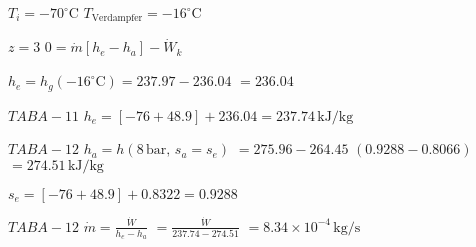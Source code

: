 \( T_i = -70^\circ \text{C} \)  
\( T_{\text{Verdampfer}} = -16^\circ \text{C} \)  

\( z = 3 \)  
\( 0 = \dot{m} [h_e - h_a] - \dot{W}_k \)  

\( h_e = h_{g}(-16^\circ \text{C}) = 237.97 - 236.04 \)  
\( = 236.04 \)  

\( TAB A-11 \)  
\( h_e = [-76 + 48.9] + 236.04 = 237.74 \, \text{kJ/kg} \)  

\( TAB A-12 \)  
\( h_a = h(8 \, \text{bar}, \, s_a = s_e) \)  
\( = 275.96 - 264.45 \)  
\( (0.9288 - 0.8066) \)  
\( = 274.51 \, \text{kJ/kg} \)  

\( s_e = [-76 + 48.9] + 0.8322 = 0.9288 \)  

\( TAB A-12 \)  
\( \dot{m} = \frac{\dot{W}}{h_e - h_a} \)  
\( = \frac{\dot{W}}{237.74 - 274.51} \)  
\( = 8.34 \times 10^{-4} \, \text{kg/s} \)